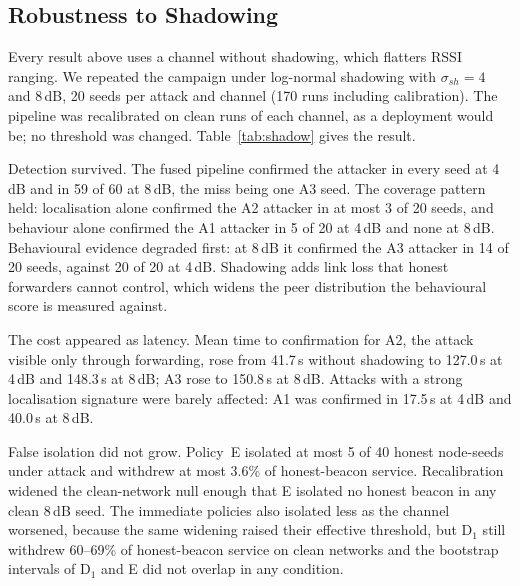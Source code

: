 \subsection{Robustness to Shadowing}
\label{sec:shadow}

Every result above uses a channel without shadowing, which flatters RSSI
ranging. We repeated the campaign under log-normal shadowing with
$\sigma_{sh} = 4$ and 8\,dB, 20 seeds per attack and channel (170 runs
including calibration). The pipeline was recalibrated on clean runs of each
channel, as a deployment would be; no threshold was changed.
Table~\ref{tab:shadow} gives the result.

Detection survived. The fused pipeline confirmed the attacker in every seed
at 4\,dB and in 59 of 60 at 8\,dB, the miss being one A3 seed. The coverage
pattern held: localisation alone confirmed the A2 attacker in at most 3 of
20 seeds, and behaviour alone confirmed the A1 attacker in 5 of 20 at
4\,dB and none at 8\,dB. Behavioural evidence degraded first: at 8\,dB it
confirmed the A3 attacker in 14 of 20 seeds, against 20 of 20 at 4\,dB.
Shadowing adds link loss that honest forwarders cannot control, which
widens the peer distribution the behavioural score is measured against.

The cost appeared as latency. Mean time to confirmation for A2, the attack
visible only through forwarding, rose from 41.7\,s without shadowing to
127.0\,s at 4\,dB and 148.3\,s at 8\,dB; A3 rose to 150.8\,s at 8\,dB.
Attacks with a strong localisation signature were barely affected: A1 was
confirmed in 17.5\,s at 4\,dB and 40.0\,s at 8\,dB.

False isolation did not grow. Policy~E isolated at most 5 of 40 honest
node-seeds under attack and withdrew at most 3.6\% of honest-beacon
service. Recalibration widened the clean-network null enough that E
isolated no honest beacon in any clean 8\,dB seed. The immediate policies
also isolated less as the channel worsened, because the same widening
raised their effective threshold, but D$_1$ still withdrew 60--69\% of
honest-beacon service on clean networks and the bootstrap intervals of
D$_1$ and E did not overlap in any condition.

